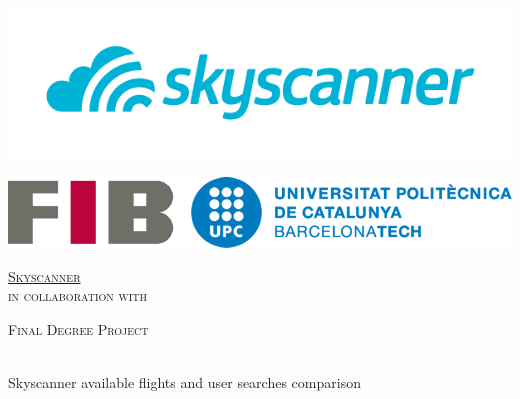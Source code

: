 \documentclass[
11pt, %
oneside, %
english,
singlespacing, %
headsepline, %
]{MastersDoctoralThesis} %
\date{\displaydate{date}}
\author{Fèlix Arribas} %
\def \company{Skyscanner}
\begin{document}

\frontmatter %

\pagestyle{plain} %


\begin{titlepage}
\begin{center}

\includegraphics[scale=0.3]{resources/logo-skyscanner.png}

\includegraphics[scale=0.2]{resources/logo-upc.png} %

\vspace*{.04\textheight}
{\scshape\LARGE \href{https://www.skyscanner.net/}{\company}\\ in collaboration with\\ \href{http://www.upc.edu}\univname\par}\vspace{1.5cm} %
\textsc{\Large Final Degree Project}\\[0.5cm] %

\HRule \\[0.4cm] %
{\Huge \bfseries \ttitle\par}\vspace{0.4cm} %
{\large Skyscanner available flights and user searches comparison\par}\vspace{0.1cm} %
\HRule \\[1.5cm] %
 

\end{center}
\end{titlepage}
\end{document}
